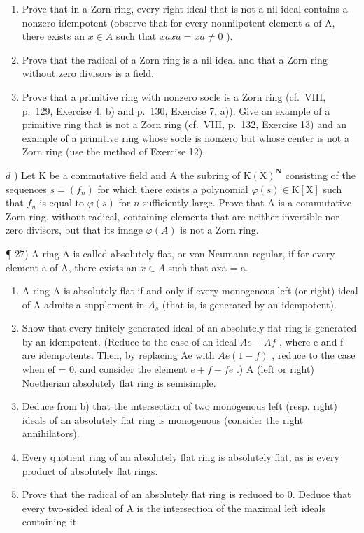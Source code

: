 \begin{enumerate}
\def\labelenumi{\alph{enumi})}
\item
  Prove that in a Zorn ring, every right ideal that is not a nil ideal contains a nonzero idempotent (observe that for every nonnilpotent element \(a\) of A, there exists an \(x \in A\) such that \(xaxa = xa \neq 0\) ).
\item
  Prove that the radical of a Zorn ring is a nil ideal and that a Zorn ring without zero divisors is a field.
\item
  Prove that a primitive ring with nonzero socle is a Zorn ring (cf.~VIII, p.~129, Exercise 4, b) and p.~130, Exercise 7, a)). Give an example of a primitive ring that is not a Zorn ring (cf.~VIII, p.~132, Exercise 13) and an example of a primitive ring whose socle is nonzero but whose center is not a Zorn ring (use the method of Exercise 12).
\end{enumerate}

\(d\) ) Let K be a commutative field and A the subring of \(\mathrm{K}(\mathrm{X})^{\mathbf{N}}\) consisting of the sequences \(s = (f_n)\) for which there exists a polynomial \(\varphi(s) \in \mathrm{K}[\mathrm{X}]\) such that \(f_n\) is equal to \(\varphi(s)\) for \(n\) sufficiently large. Prove that A is a commutative Zorn ring, without radical, containing elements that are neither invertible nor zero divisors, but that its image \(\varphi(A)\) is not a Zorn ring.

¶ 27) A ring A is called absolutely flat, or von Neumann regular, if for every element a of A, there exists an \(x \in A\) such that axa = a.

\begin{enumerate}
\def\labelenumi{\alph{enumi})}
\item
  A ring A is absolutely flat if and only if every monogenous left (or right) ideal of A admits a supplement in \(A_{s}\) (that is, is generated by an idempotent).
\item
  Show that every finitely generated ideal of an absolutely flat ring is generated by an idempotent. (Reduce to the case of an ideal \(Ae + Af\) , where e and f are idempotents. Then, by replacing Ae with \(Ae(1 - f)\) , reduce to the case when ef = 0, and consider the element \(e + f - fe\) .) A (left or right) Noetherian absolutely flat ring is semisimple.
\item
  Deduce from b) that the intersection of two monogenous left (resp. right) ideals of an absolutely flat ring is monogenous (consider the right annihilators).
\item
  Every quotient ring of an absolutely flat ring is absolutely flat, as is every product of absolutely flat rings.
\item
  Prove that the radical of an absolutely flat ring is reduced to 0. Deduce that every two-sided ideal of A is the intersection of the maximal left ideals containing it.
\end{enumerate}

